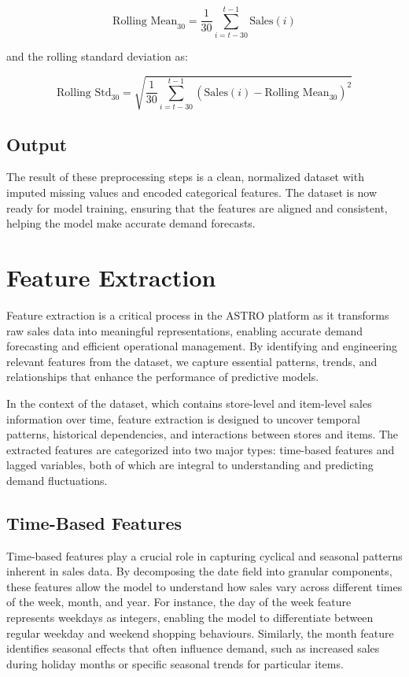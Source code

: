 \[
    \text{Rolling Mean}_{30} = \frac{1}{30} \sum_{i=t-30}^{t-1} \text{Sales}(i)
\]

and the rolling standard deviation as:

\[
    \text{Rolling Std}_{30} = \sqrt{\frac{1}{30} \sum_{i=t-30}^{t-1} (\text{Sales}(i) - \text{Rolling Mean}_{30})^2}
\]


\subsection*{Output}

The result of these preprocessing steps is a clean, normalized dataset with imputed missing values and encoded categorical features. The dataset is now ready for model training, ensuring that the features are aligned and consistent, helping the model make accurate demand forecasts.

\section{Feature Extraction}

Feature extraction is a critical process in the ASTRO platform as it transforms raw sales data into meaningful representations, enabling accurate demand forecasting and efficient operational management. By identifying and engineering relevant features from the dataset, we capture essential patterns, trends, and relationships that enhance the performance of predictive models.

In the context of the dataset, which contains store-level and item-level sales information over time, feature extraction is designed to uncover temporal patterns, historical dependencies, and interactions between stores and items. The extracted features are categorized into two major types: time-based features and lagged variables, both of which are integral to understanding and predicting demand fluctuations.

\subsection{Time-Based Features}

Time-based features play a crucial role in capturing cyclical and seasonal patterns inherent in sales data. By decomposing the date field into granular components, these features allow the model to understand how sales vary across different times of the week, month, and year. For instance, the day of the week feature represents weekdays as integers, enabling the model to differentiate between regular weekday and weekend shopping behaviours. Similarly, the month feature identifies seasonal effects that often influence demand, such as increased sales during holiday months or specific seasonal trends for particular items.

